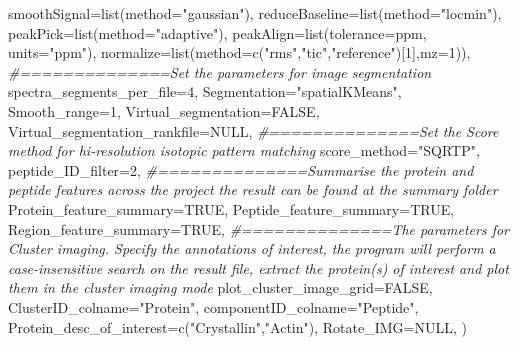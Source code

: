 \documentclass[
]{article}
\newenvironment{Shaded}{\begin{snugshade}}{\end{snugshade}}
\newcommand{\AttributeTok}[1]{\textcolor[rgb]{0.77,0.63,0.00}{#1}}
\newcommand{\CommentTok}[1]{\textcolor[rgb]{0.56,0.35,0.01}{\textit{#1}}}
\newcommand{\ConstantTok}[1]{\textcolor[rgb]{0.00,0.00,0.00}{#1}}
\newcommand{\DecValTok}[1]{\textcolor[rgb]{0.00,0.00,0.81}{#1}}
\newcommand{\FunctionTok}[1]{\textcolor[rgb]{0.00,0.00,0.00}{#1}}
\newcommand{\NormalTok}[1]{#1}
\newcommand{\StringTok}[1]{\textcolor[rgb]{0.31,0.60,0.02}{#1}}
\begin{document}
\begin{Shaded}
\begin{Highlighting}[]
                               \AttributeTok{smoothSignal=}\FunctionTok{list}\NormalTok{(}\AttributeTok{method=}\StringTok{"gaussian"}\NormalTok{),}
                               \AttributeTok{reduceBaseline=}\FunctionTok{list}\NormalTok{(}\AttributeTok{method=}\StringTok{"locmin"}\NormalTok{),}
                               \AttributeTok{peakPick=}\FunctionTok{list}\NormalTok{(}\AttributeTok{method=}\StringTok{"adaptive"}\NormalTok{),}
                               \AttributeTok{peakAlign=}\FunctionTok{list}\NormalTok{(}\AttributeTok{tolerance=}\NormalTok{ppm, }\AttributeTok{units=}\StringTok{"ppm"}\NormalTok{),}
                               \AttributeTok{normalize=}\FunctionTok{list}\NormalTok{(}\AttributeTok{method=}\FunctionTok{c}\NormalTok{(}\StringTok{"rms"}\NormalTok{,}\StringTok{"tic"}\NormalTok{,}\StringTok{"reference"}\NormalTok{)[}\DecValTok{1}\NormalTok{],}\AttributeTok{mz=}\DecValTok{1}\NormalTok{)),}
\CommentTok{\#==============Set the parameters for image segmentation}
               \AttributeTok{spectra\_segments\_per\_file=}\DecValTok{4}\NormalTok{,}
               \AttributeTok{Segmentation=}\StringTok{"spatialKMeans"}\NormalTok{,}
               \AttributeTok{Smooth\_range=}\DecValTok{1}\NormalTok{,}
               \AttributeTok{Virtual\_segmentation=}\ConstantTok{FALSE}\NormalTok{,}
               \AttributeTok{Virtual\_segmentation\_rankfile=}\ConstantTok{NULL}\NormalTok{,}
\CommentTok{\#==============Set the Score method for hi{-}resolution isotopic pattern matching}
               \AttributeTok{score\_method=}\StringTok{"SQRTP"}\NormalTok{,}
               \AttributeTok{peptide\_ID\_filter=}\DecValTok{2}\NormalTok{,}
\CommentTok{\#==============Summarise the protein and peptide features across the project the result can be found at the summary folder}
               \AttributeTok{Protein\_feature\_summary=}\ConstantTok{TRUE}\NormalTok{,}
               \AttributeTok{Peptide\_feature\_summary=}\ConstantTok{TRUE}\NormalTok{,}
               \AttributeTok{Region\_feature\_summary=}\ConstantTok{TRUE}\NormalTok{,}
\CommentTok{\#==============The parameters for Cluster imaging. Specify the annotations of interest, the program will perform a case{-}insensitive search on the result file, extract the protein(s) of interest and plot them in the cluster imaging mode}
               \AttributeTok{plot\_cluster\_image\_grid=}\ConstantTok{FALSE}\NormalTok{,}
               \AttributeTok{ClusterID\_colname=}\StringTok{"Protein"}\NormalTok{,}
               \AttributeTok{componentID\_colname=}\StringTok{"Peptide"}\NormalTok{,}
               \AttributeTok{Protein\_desc\_of\_interest=}\FunctionTok{c}\NormalTok{(}\StringTok{"Crystallin"}\NormalTok{,}\StringTok{"Actin"}\NormalTok{),}
               \AttributeTok{Rotate\_IMG=}\ConstantTok{NULL}\NormalTok{,}
\NormalTok{               )}
\end{Highlighting}
\end{Shaded}
\end{document}
